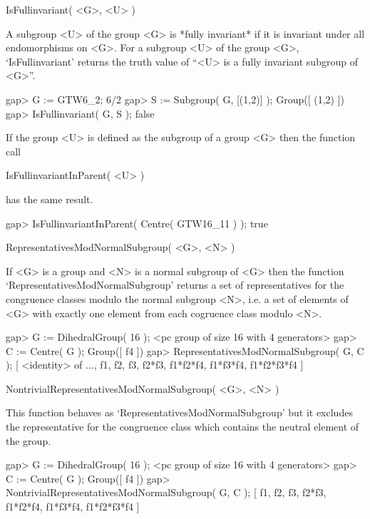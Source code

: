 \>IsFullinvariant( <G>, <U> )

A subgroup <U> of the group <G> is *fully invariant* if it is invariant under
all endomorphisms on <G>. 
For a subgroup <U> of the group <G>, `IsFullinvariant' returns the
truth value of ``<U> is a fully invariant subgroup of <G>''.

\beginexample
    gap> G := GTW6_2;
    6/2
    gap> S := Subgroup( G, [(1,2)] );                                
    Group([ (1,2) ])
    gap> IsFullinvariant( G, S );
    false
\endexample

If the group <U> is defined as the subgroup of a group <G> then the function
call

\>IsFullinvariantInParent( <U> )

has the same result.

\beginexample
    gap> IsFullinvariantInParent( Centre( GTW16_11 ) );
    true
\endexample



\>RepresentativesModNormalSubgroup( <G>, <N> )

If <G> is a group and <N> is a normal subgroup of <G> then the function
`RepresentativesModNormalSubgroup' returns a set of representatives for
the congruence classes modulo the normal subgroup <N>, i.e. a set of elements
of <G> with exactly one element from each cogruence class modulo <N>.

\beginexample
    gap> G := DihedralGroup( 16 );
    <pc group of size 16 with 4 generators>
    gap> C := Centre( G );
    Group([ f4 ])
    gap> RepresentativesModNormalSubgroup( G, C );
    [ <identity> of ..., f1, f2, f3, f2*f3, f1*f2*f4, f1*f3*f4, 
      f1*f2*f3*f4 ]
\endexample

\>NontrivialRepresentativesModNormalSubgroup( <G>, <N> )

This function behaves as `RepresentativesModNormalSubgroup' but it excludes
the representative for the congruence class which contains the neutral element
of the group.

\beginexample
    gap> G := DihedralGroup( 16 );
    <pc group of size 16 with 4 generators>
    gap> C := Centre( G );
    Group([ f4 ])
    gap> NontrivialRepresentativesModNormalSubgroup( G, C );
    [ f1, f2, f3, f2*f3, f1*f2*f4, f1*f3*f4, f1*f2*f3*f4 ]
\endexample




